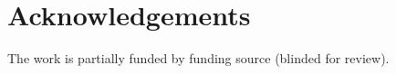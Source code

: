 \documentclass[sigconf,review, anonymous]{acmart}
\theoremstyle{break}
\theoremstyle{break}
\begin{document}
\section*{Acknowledgements}
The work is partially funded by
funding source (blinded for review).

\balance

%


 
\end{document}
